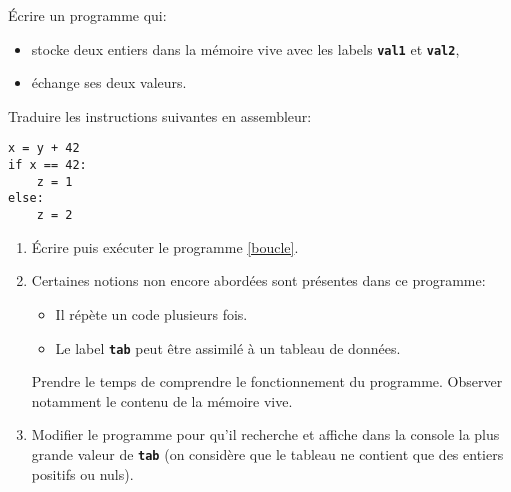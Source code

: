\documentclass[a4paper,11pt]{article}
\begin{document}
\begin{exo}
Écrire un programme qui:
\begin{itemize}
    \item stocke deux entiers dans la mémoire vive avec les labels \textbf{\texttt{val1}} et \textbf{\texttt{val2}},
    \item échange ses deux valeurs.
\end{itemize}
\end{exo}
\begin{exo}
    Traduire les instructions suivantes en assembleur:
    \begin{lstlisting}[caption=Un code en Python]
x = y + 42
if x == 42:
    z = 1
else:
    z = 2
\end{lstlisting}
\end{exo}
\begin{exo}
\begin{enumerate}
    \item Écrire puis exécuter le programme \ref{boucle}.
    
    \item Certaines notions non encore abordées sont présentes dans ce programme:
    \begin{itemize}
        \item Il répète un code plusieurs fois.
        \item Le label \textbf{\texttt{tab}} peut être assimilé à un tableau de données.
    \end{itemize} 
    Prendre le temps de comprendre le fonctionnement du programme. Observer notamment le contenu de la mémoire vive.
    \item Modifier le programme pour qu'il recherche et affiche dans la console la plus grande valeur de \textbf{\texttt{tab}} (on considère que le tableau ne contient que des entiers positifs ou nuls).
\end{enumerate}
\end{exo}
\end{document}
